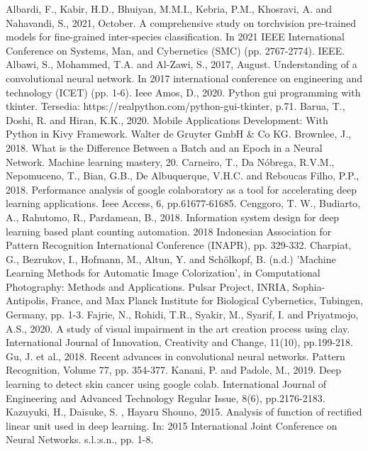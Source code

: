 \documentclass[conference]{IEEEtran}
\begin{document}
\begin{thebibliography}{00}
     Albardi, F., Kabir, H.D., Bhuiyan, M.M.I., Kebria, P.M., Khosravi, A. and Nahavandi, S., 2021, October. A comprehensive study on torchvision pre-trained models for fine-grained inter-species classification. In 2021 IEEE International Conference on Systems, Man, and Cybernetics (SMC) (pp. 2767-2774). IEEE.
     Albawi, S., Mohammed, T.A. and Al-Zawi, S., 2017, August. Understanding of a convolutional neural network. In 2017 international conference on engineering and technology (ICET) (pp. 1-6). Ieee
     Amos, D., 2020. Python gui programming with tkinter. Tersedia: https://realpython.com/python-gui-tkinter, p.71.
     Barua, T., Doshi, R. and Hiran, K.K., 2020. Mobile Applications Development: With Python in Kivy Framework. Walter de Gruyter GmbH \& Co KG.
     Brownlee, J., 2018. What is the Difference Between a Batch and an Epoch in a Neural Network. Machine learning mastery, 20.
     Carneiro, T., Da Nóbrega, R.V.M., Nepomuceno, T., Bian, G.B., De Albuquerque, V.H.C. and Reboucas Filho, P.P., 2018. Performance analysis of google colaboratory as a tool for accelerating deep learning applications. Ieee Access, 6, pp.61677-61685.
     Cenggoro, T. W., Budiarto, A., Rahutomo, R., Pardamean, B., 2018. Information system design for deep learning based plant counting automation. 2018 Indonesian Association for Pattern Recognition International Conference (INAPR), pp. 329-332.
     Charpiat, G., Bezrukov, I., Hofmann, M., Altun, Y. and Schölkopf, B. (n.d.) 'Machine Learning Methods for Automatic Image Colorization', in Computational Photography: Methods and Applications. Pulsar Project, INRIA, Sophia-Antipolis, France, and Max Planck Institute for Biological Cybernetics, Tubingen, Germany, pp. 1-3.
     Fajrie, N., Rohidi, T.R., Syakir, M., Syarif, I. and Priyatmojo, A.S., 2020. A study of visual impairment in the art creation process using clay. International Journal of Innovation, Creativity and Change, 11(10), pp.199-218.
     Gu, J. et al., 2018. Recent advances in convolutional neural networks. Pattern Recognition, Volume 77, pp. 354-377.
     Kanani, P. and Padole, M., 2019. Deep learning to detect skin cancer using google colab. International Journal of Engineering and Advanced Technology Regular Issue, 8(6), pp.2176-2183.
     Kazuyuki, H., Daisuke, S. , Hayaru Shouno, 2015. Analysis of function of rectified linear unit used in deep learning. In: 2015 International Joint Conference on Neural Networks. s.l.:s.n., pp. 1-8.

\end{thebibliography}
\end{document}
